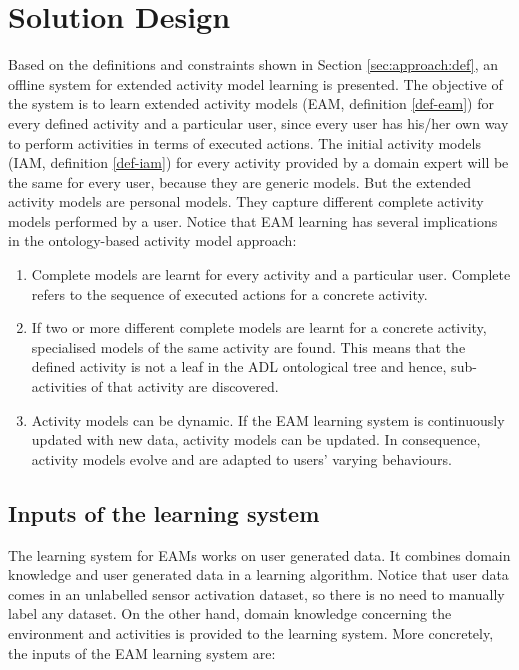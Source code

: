 \section{Solution Design}
\label{sec:approach:solution}

Based on the definitions and constraints shown in Section \ref{sec:approach:def}, an offline system for extended activity model learning is presented. The objective of the system is to learn extended activity models (EAM, definition \ref{def-eam}) for every defined activity and a particular user, since every user has his/her own way to perform activities in terms of executed actions. The initial activity models (IAM, definition \ref{def-iam}) for every activity provided by a domain expert will be the same for every user, because they are generic models. But the extended activity models are personal models. They capture different complete activity models performed by a user. Notice that EAM learning has several implications in the ontology-based activity model approach:

\begin{enumerate}
 \item Complete models are learnt for every activity and a particular user. Complete refers to the sequence of executed actions for a concrete activity.
 \item If two or more different complete models are learnt for a concrete activity, specialised models of the same activity are found. This means that the defined activity is not a leaf in the ADL ontological tree and hence, sub-activities of that activity are discovered.
 \item Activity models can be dynamic. If the EAM learning system is continuously updated with new data, activity models can be updated. In consequence, activity models evolve and are adapted to users' varying behaviours.
\end{enumerate}

\subsection{Inputs of the learning system}

The learning system for EAMs works on user generated data. It combines domain knowledge and user generated data in a learning algorithm. Notice that user data comes in an unlabelled sensor activation dataset, so there is no need to manually label any dataset. On the other hand, domain knowledge concerning the environment and activities is provided to the learning system. More concretely, the inputs of the EAM learning system are:

